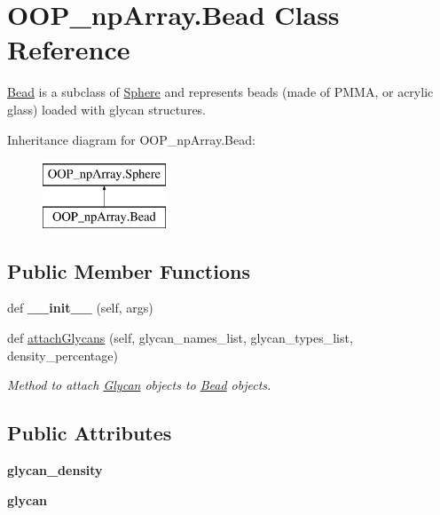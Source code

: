 \hypertarget{class_o_o_p__np_array_1_1_bead}{}\section{O\+O\+P\+\_\+np\+Array.\+Bead Class Reference}
\label{class_o_o_p__np_array_1_1_bead}


\mbox{\hyperlink{class_o_o_p__np_array_1_1_bead}{Bead}} is a subclass of \mbox{\hyperlink{class_o_o_p__np_array_1_1_sphere}{Sphere}} and represents beads (made of P\+M\+MA, or acrylic glass) loaded with glycan structures.  


Inheritance diagram for O\+O\+P\+\_\+np\+Array.\+Bead\+:\begin{figure}[H]
\begin{center}
\leavevmode
\includegraphics[height=2.000000cm]{class_o_o_p__np_array_1_1_bead}
\end{center}
\end{figure}
\subsection*{Public Member Functions}
\begin{DoxyCompactItemize}
\item 
\mbox{\label{class_o_o_p__np_array_1_1_bead_a519936bf65fdbd556b6f48672140383b}} 
def {\bfseries \+\_\+\+\_\+init\+\_\+\+\_\+} (self, args)
\item 
def \mbox{\hyperlink{class_o_o_p__np_array_1_1_bead_a107832d8794984eb40de00557d1ddfcc}{attach\+Glycans}} (self, glycan\+\_\+names\+\_\+list, glycan\+\_\+types\+\_\+list, density\+\_\+percentage)
\begin{DoxyCompactList}\small\item\em Method to attach \mbox{\hyperlink{class_o_o_p__np_array_1_1_glycan}{Glycan}} objects to \mbox{\hyperlink{class_o_o_p__np_array_1_1_bead}{Bead}} objects. \end{DoxyCompactList}\end{DoxyCompactItemize}
\subsection*{Public Attributes}
\begin{DoxyCompactItemize}
\item 
\mbox{\label{class_o_o_p__np_array_1_1_bead_a0ea948de6ab932e0d61acab9a1eec37b}} 
{\bfseries glycan\+\_\+density}
\item 
\mbox{\label{class_o_o_p__np_array_1_1_bead_a37d48a1d59eabe3093c6f7452443b5a7}} 
{\bfseries glycan}
\end{DoxyCompactItemize}


